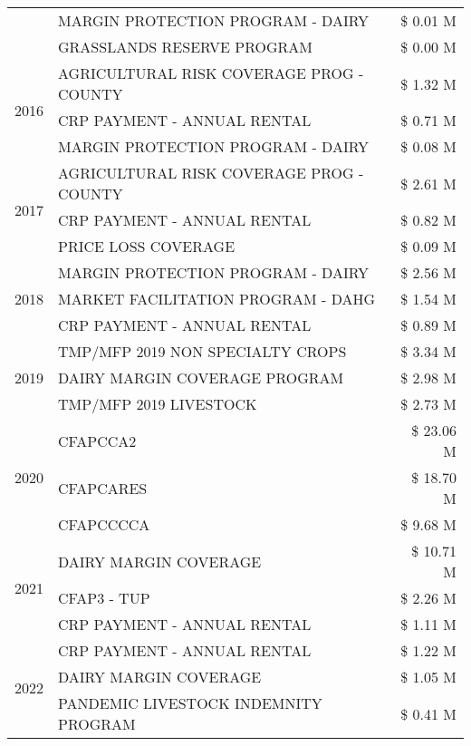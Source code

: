 \begin{tabular}{llr}
 & MARGIN PROTECTION PROGRAM - DAIRY & \$ 0.01 M \\
 & GRASSLANDS RESERVE PROGRAM & \$ 0.00 M \\
\cline{1-3}
\multirow[t]{3}{*}{2016} & AGRICULTURAL RISK COVERAGE PROG - COUNTY & \$ 1.32 M \\
 & CRP PAYMENT - ANNUAL RENTAL & \$ 0.71 M \\
 & MARGIN PROTECTION PROGRAM - DAIRY & \$ 0.08 M \\
\cline{1-3}
\multirow[t]{3}{*}{2017} & AGRICULTURAL RISK COVERAGE PROG - COUNTY & \$ 2.61 M \\
 & CRP PAYMENT - ANNUAL RENTAL & \$ 0.82 M \\
 & PRICE LOSS COVERAGE & \$ 0.09 M \\
\cline{1-3}
\multirow[t]{3}{*}{2018} & MARGIN PROTECTION PROGRAM - DAIRY & \$ 2.56 M \\
 & MARKET FACILITATION PROGRAM - DAHG & \$ 1.54 M \\
 & CRP PAYMENT - ANNUAL RENTAL & \$ 0.89 M \\
\cline{1-3}
\multirow[t]{3}{*}{2019} & TMP/MFP 2019 NON SPECIALTY CROPS & \$ 3.34 M \\
 & DAIRY MARGIN COVERAGE PROGRAM & \$ 2.98 M \\
 & TMP/MFP 2019 LIVESTOCK & \$ 2.73 M \\
\cline{1-3}
\multirow[t]{3}{*}{2020} & CFAPCCA2 & \$ 23.06 M \\
 & CFAPCARES & \$ 18.70 M \\
 & CFAPCCCCA & \$ 9.68 M \\
\cline{1-3}
\multirow[t]{3}{*}{2021} & DAIRY MARGIN COVERAGE & \$ 10.71 M \\
 & CFAP3 - TUP & \$ 2.26 M \\
 & CRP PAYMENT - ANNUAL RENTAL & \$ 1.11 M \\
\cline{1-3}
\multirow[t]{3}{*}{2022} & CRP PAYMENT - ANNUAL RENTAL & \$ 1.22 M \\
 & DAIRY MARGIN COVERAGE & \$ 1.05 M \\
 & PANDEMIC LIVESTOCK INDEMNITY PROGRAM & \$ 0.41 M \\
\cline{1-3}
\bottomrule
\end{tabular}
